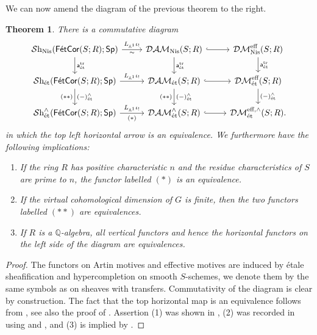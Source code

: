 \documentclass[reqno]{amsart}
\numberwithin{equation}{section}\theoremstyle{thms}
\newtheorem{thm}[equation]{Theorem}
\theoremstyle{defn}
\newcommand{\bA}{\mathbb{A}}
\newcommand{\bQ}{\mathbb{Q}}
\newcommand{\tn}[1]{\textnormal{#1}}
\newcommand{\tsf}[1]{\textsf{\textup{#1}}}
\newcommand{\mcal}[1]{\mathcal{#1}}
\newcommand{\sheaves}{\mcal{S}\tn{h}}
\newcommand{\spec}{\tsf{Sp}}
\newcommand{\corfets}[1]{\tsf{FétCor}(S;#1)}
\begin{document}
We can now amend the diagram of the previous theorem to the right.

\begin{thm}\label{thm:bigdiagramright}
There is a commutative diagram
\[\begin{tikzcd}
	{\sheaves_{\tn{Nis}}(\corfets{R};\spec)} & {\mcal{DAM}_{\tn{Nis}}(S;R)} & {\mcal{DM}^{\tn{eff}}_{\tn{Nis}}(S;R)} \\
	{\sheaves_{\tn{ét}}(\corfets{R};\spec)} & {\mcal{DAM}_{\tn{ét}}(S;R)} & {\mcal{DM}^{\tn{eff}}_{\tn{ét}}(S;R)}\\
	{\sheaves_{\tn{ét}}^{\wedge}(\corfets{R};\spec)} & {\mcal{DAM}^{\wedge}_{\tn{ét}}(S;R)} & {\mcal{DM}^{\tn{eff},\wedge}_{\tn{ét}}(S;R).}
	\arrow["{L_{\bA^1}\iota_!}", from=1-1, to=1-2]
	\arrow["\sim"', draw=none, from=1-1, to=1-2]
	\arrow["{\tsf{a}^{\tn{tr}}_{\tn{ét}}}", from=1-1, to=2-1]
	\arrow["{\tsf{a}^{\tn{tr}}_{\tn{ét}}}", from=1-2, to=2-2]
    \arrow["{\tsf{a}^{\tn{tr}}_{\tn{ét}}}", from=1-3, to=2-3]
	\arrow["{L_{\bA^1}\iota_!}", from=2-1, to=2-2]
    \arrow["(\ast)"', draw=none, from=3-1, to=3-2]
	\arrow["{(-)^\wedge_\tn{ét}}", from=2-1, to=3-1]
    \arrow["(\ast\ast)"', draw=none, from=2-1, to=3-1]
	\arrow["{(-)^\wedge_\tn{ét}}", from=2-2, to=3-2]
    \arrow["(\ast\ast)"', draw=none, from=2-2, to=3-2]
    \arrow["{(-)^\wedge_\tn{ét}}", from=2-3, to=3-3]
	\arrow["{L_{\bA^1}\iota_!}", from=3-1, to=3-2]
    \arrow[hook, from=1-2, to=1-3]
    \arrow[hook, from=2-2, to=2-3]
    \arrow[hook, from=3-2, to=3-3]
\end{tikzcd}\]
in which the top left horizontal arrow is an equivalence. We furthermore have the following implications:
\begin{enumerate}
    \item If the ring $R$ has positive characteristic $n$ and the residue characteristics of $S$ are prime to $n$, the functor labelled $(\ast)$ is an equivalence.
    \item If the virtual cohomological dimension of $G$ is finite, then the two functors labelled $(\ast\ast)$ are equivalences.
    \item If $R$ is a $\bQ$-algebra, all vertical functors and hence the horizontal functors on the left side of the diagram are equivalences.
\end{enumerate}
\end{thm}
\begin{proof}
The functors on Artin motives and effective motives are induced by étale sheafification and hypercompletion on smooth $S$-schemes, we denote them by the same symbols as on sheaves with transfers. Commutativity of the diagram is clear by construction. The fact that the top horizontal map is an equivalence follows from , see also the proof of . Assertion (1) was shown in  , (2) was recorded in  using  and , and (3) is implied by \cite[Proposition 2.2.10]{cd16}.
\end{proof}
\end{document}

